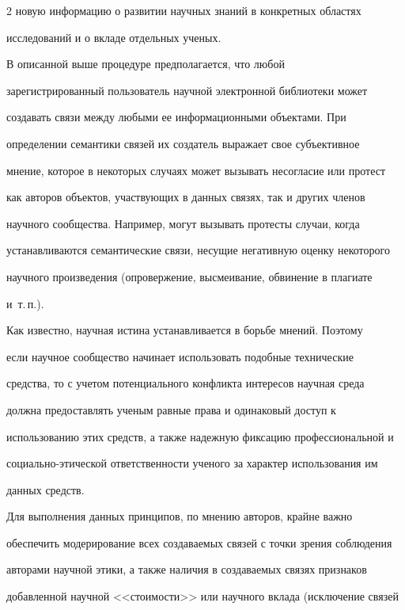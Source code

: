 \begin{multicols}{2}
новую информацию о развитии научных знаний в конкретных областях 


исследований и о вкладе отдельных ученых.


  


  В описанной выше процедуре предполагается, что любой 


зарегистрированный пользователь научной электронной библиотеки может 


создавать связи между любыми ее информационными объектами. При 


определении семантики связей их создатель выражает свое субъективное 


мнение, которое в некоторых случаях может вызывать несогласие или протест 


как авторов объектов, участвующих в данных связях, так и других членов 


научного сообщества. Например, могут вызывать протесты случаи, когда 


устанавливаются семантические связи, несущие негативную оценку некоторого 


научного произведения (опровержение, высмеивание, обвинение в плагиате 


и~т.\,п.). 


  


  Как известно, научная истина устанавливается в борьбе мнений. Поэтому 


если научное сообщество начинает использовать подобные технические 


средства, то с учетом потенциального конфликта интересов научная среда 


должна предоставлять ученым равные права и одинаковый доступ к 


использованию этих средств, а также надежную фиксацию профессиональной и 


социально-этической ответственности ученого за характер использования им 


данных средств.


  


  Для выполнения данных принципов, по мнению авторов, крайне важно 


обеспечить модерирование всех создаваемых связей с точки зрения соблюдения 


авторами научной этики, а также наличия в создаваемых связях признаков 


добавленной научной <<стоимости>> или научного вклада (исключение связей 



\end{multicols}
